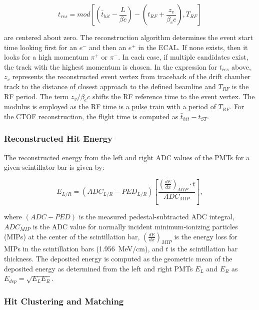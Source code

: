 \documentclass{elsart}
\begin{document}
\begin{equation}
  t_{res} = mod \left [ \left (\bar{t}_{hit} - \frac{L}{\beta c} \right) - \left (t_{RF} + \frac{z_v}{\beta_e c} \right),
    T_{RF} \right ]
\end{equation}

\noindent
are centered about zero. The reconstruction algorithm determines the event start time looking first for an
$e^-$ and then an $e^+$ in the ECAL. If none exists, then it looks for a high momentum $\pi^+$ or $\pi^-$. In
each case, if multiple candidates exist, the track with the highest momentum is chosen. In the expression for
$t_{res}$ above, $z_v$ represents the reconstructed event vertex from traceback of the drift chamber track
to the distance of closest approach to the defined beamline and $T_{RF}$ is the RF period. The term
$z_v/\beta_e c$ shifts the RF reference time to the event vertex. The modulus is employed as the RF time is a
pulse train with a period of $T_{RF}$. For the CTOF reconstruction, the flight time is computed as
$\bar{t}_{hit} - t_{ST}$.

\subsubsection{Reconstructed Hit Energy}
\label{rec:energy}

The reconstructed energy from the left and right ADC values of the PMTs for a given scintillator bar is given by:

\begin{equation}
E_{L/R} = (ADC_{L/R} - PED_{L/R}) \left [ \frac{\left( \frac{dE}{dx} \right )_{MIP} \cdot t}{ADC_{MIP}} \right ],
\end{equation}

\noindent
where $(ADC  - PED)$ is the measured pedestal-subtracted ADC integral, $ADC_{MIP}$ is the ADC value for normally
incident minimum-ionizing particles (MIPs) at the center of the scintillation bar, $\left( \frac{dE}{dx} \right)_{MIP}$
is the energy loss for MIPs in the scintillation bars (1.956~MeV/cm), and $t$ is the scintillation bar thickness.
The deposited energy is computed as the geometric mean of the deposited energy as determined from the left and
right PMTs $E_L$ and $E_R$ as $E_{dep} = \sqrt{E_L E_R}$.

\subsubsection{Hit Clustering and Matching}
\end{document}
